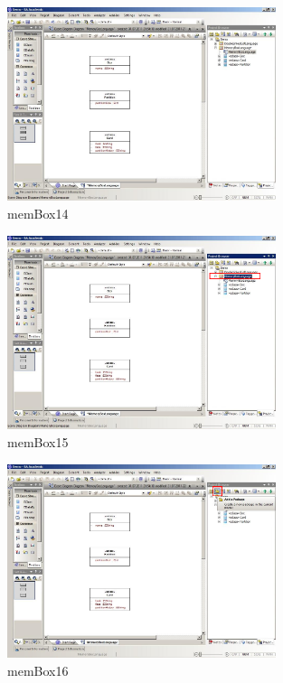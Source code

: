 \begin{figure}[htbp]
	\centering
  \includegraphics[width=0.7\textwidth]{pics/memBox14.png}
	\caption{memBox14}
	\label{memBox14}
\end{figure}

\begin{figure}[htbp]
	\centering
  \includegraphics[width=0.7\textwidth]{pics/memBox15.png}
	\caption{memBox15}
	\label{memBox15}
\end{figure}

\begin{figure}[htbp]
	\centering
  \includegraphics[width=0.7\textwidth]{pics/memBox16.png}
	\caption{memBox16}
	\label{memBox16}
\end{figure}

